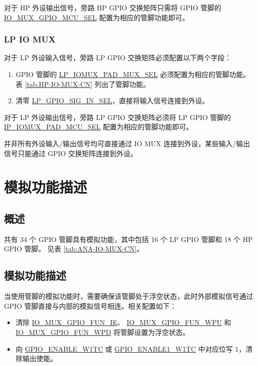 \documentclass[main\_\_CN.tex]{subfiles}
\begin{document}
对于 HP 外设输出信号，旁路 HP GPIO 交换矩阵只需将 GPIO 管脚的 \hyperref[fielddesc:IOMUXGPIONMCUSEL]{IO\_MUX\_GPIO\_MCU\_SEL} 配置为相应的管脚功能即可。

\subsubsection{LP IO MUX}
对于 LP 外设输入信号，旁路 LP GPIO 交换矩阵必须配置以下两个字段：

\begin{enumerate}
\item GPIO 管脚的 \hyperref[fielddesc:LPIOMUXPADNMUXSEL] {LP\_IOMUX\_PAD\_MUX\_SEL} 必须配置为相应的管脚功能。表 \ref{tab:HP-IO-MUX-CN} 列出了管脚功能。
\item 清零 \hyperref[fielddesc:LPGPIOSIGNINSEL] {LP\_GPIO\_SIG\_IN\_SEL}，直接将输入信号连接到外设。
\end{enumerate}

对于 LP 外设输出信号，旁路 LP GPIO 交换矩阵必须将 LP GPIO 管脚的 \hyperref[fielddesc:LPIOMUXPADNMUXSEL]{IP\_IOMUX\_PAD\_MCU\_SEL} 配置为相应的管脚功能即可。
\begin{tiplisting}
并非所有外设输入/输出信号均可直接通过 IO MUX 连接到外设，某些输入/输出信号只能通过 GPIO 交换矩阵连接到外设。
\end{tiplisting}

\section{模拟功能描述}

\subsection{概述}
\chipname{} 共有 34 个 GPIO 管脚具有模拟功能，其中包括 16 个 LP GPIO 管脚和 18 个 HP GPIO 管脚。
见表 \ref{tab:ANA-IO-MUX-CN}。

\subsection{模拟功能描述}
当使用管脚的模拟功能时，需要确保该管脚处于浮空状态，此时外部模拟信号通过 GPIO 管脚直接与内部的模拟信号相连。相关配置如下：

\begin{itemize}
    \item 清除 \hyperref[fielddesc:IOMUXGPIONFUNIE]{IO\_MUX\_GPIO\_FUN\_IE}、 \hyperref[fielddesc:IOMUXGPIONFUNWPU]{IO\_MUX\_GPIO\_FUN\_WPU} 和  \hyperref[fielddesc:IOMUXGPIONFUNWPD]{IO\_MUX\_GPIO\_FUN\_WPD} 将管脚设置为浮空状态。
    \item 向 \hyperref[regdesc:GPIOENABLEW1TCREG]{GPIO\_ENABLE\_W1TC} 或  \hyperref[regdesc:GPIOENABLE1W1TCREG]{GPIO\_ENABLE1\_W1TC} 中对应位写 1，清除输出使能。
\end{itemize}
\end{document}
